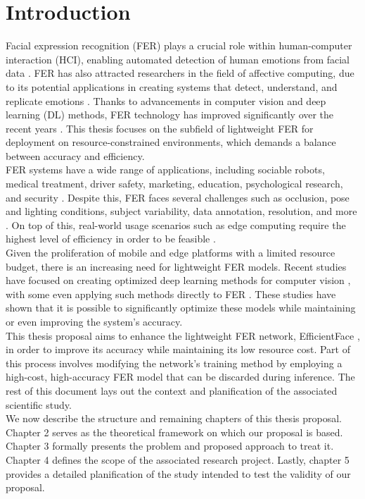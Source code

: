 \documentclass[../main.tex]{subfiles}
\begin{document}
\chapter{Introduction}

Facial expression recognition (FER) plays a crucial role within human-computer interaction (HCI), enabling automated detection of human emotions from facial data \cite{li2022survey}.
FER has also attracted researchers in the field of affective computing, due to its potential applications in creating systems that detect, understand, and replicate emotions \cite{karnati2023survey}.
Thanks to advancements in computer vision and deep learning (DL) methods, FER technology has improved significantly over the recent years \cite{li2022survey}.
This thesis focuses on the subfield of lightweight FER for deployment on resource-constrained environments, which demands a balance between accuracy and efficiency.\\

FER systems have a wide range of applications, including sociable robots, medical treatment, driver safety, marketing, education, psychological research, and security \cite{li2022survey, canal2022survey, karnati2023survey, sajjad2023survey}.
Despite this, FER faces several challenges such as occlusion, pose and lighting conditions, subject variability, data annotation, resolution, and more \cite{li2022survey, sajjad2023survey}.
On top of this, real-world usage scenarios such as edge computing require the highest level of efficiency in order to be feasible \cite{wu2020edge}.\\

Given the proliferation of mobile and edge platforms with a limited resource budget, there is an increasing need for lightweight FER models.
Recent studies have focused on creating optimized deep learning methods for computer vision \cite{howard2017mobilenet, zhang2018shufflenet}, with some even applying such methods directly to FER \cite{eff-face2021, lengwe2023pattlite}.
These studies have shown that it is possible to significantly optimize these models while maintaining or even improving the system's accuracy.\\

This thesis proposal aims to enhance the lightweight FER network, EfficientFace \cite{eff-face2021}, in order to improve its accuracy while maintaining its low resource cost.
Part of this process involves modifying the network's training method by employing a high-cost, high-accuracy FER model \cite{apvit2023} that can be discarded during inference.
The rest of this document lays out the context and planification of the associated scientific study.\\

We now describe the structure and remaining chapters of this thesis proposal. 
Chapter 2 serves as the theoretical framework on which our proposal is based.
Chapter 3 formally presents the problem and proposed approach to treat it.
Chapter 4 defines the scope of the associated research project.
Lastly, chapter 5 provides a detailed planification of the study intended to test the validity of our proposal.
\end{document}
